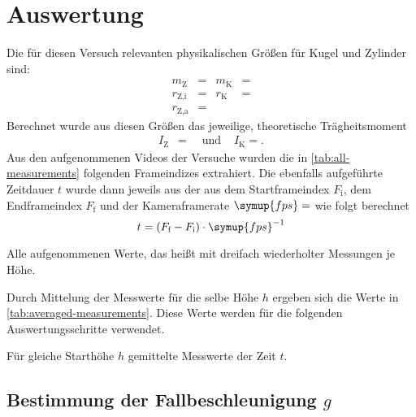 \section{Auswertung}
\label{sec:Auswertung}
Die für diesen Versuch relevanten physikalischen Größen für Kugel und Zylinder sind:
\begin{align}
  \label{eq:physical-properties}
  m_\text{Z} &=  & m_\text{K} &= \nonumber\\
  r_{\text{Z},\text{i}} &=  & r_\text{K} &= \\
  r_{\text{Z},\text{a}} &=  &&\nonumber
\end{align}
Berechnet wurde aus diesen Größen das jeweilige, theoretische Trägheitsmoment
\begin{align}
  \label{eq:moments-inertia}
  I_\text{Z} &= \quad\text{ und } & I_\text{K} = .
\end{align}
Aus den aufgenommenen Videos der Versuche wurden die in \autoref{tab:all-measurements} folgenden Frameindizes extrahiert.
Die ebenfalls aufgeführte Zeitdauer $t$ wurde dann jeweils aus der aus dem Startframeindex $F_\text{i}$,
dem Endframeindex $F_\text{f}$ und der Kameraframerate $\symup{fps}=$ wie folgt 
berechnet
\begin{equation*}
  t = (F_\text{f} - F_\text{i})\cdot\symup{fps}^{-1}
\end{equation*}

\begin{table}
  \centering
  \caption{Alle aufgenommenen Werte, das heißt mit dreifach wiederholter Messungen je Höhe.}
  \label{tab:all-measurements}
  
\end{table}

Durch Mittelung der Messwerte für die selbe Höhe $h$ ergeben sich die Werte
in \autoref{tab:averaged-measurements}. Diese Werte werden für die folgenden
Auswertungsschritte verwendet.

\begin{table}
  \centering
  \caption{Für gleiche Starthöhe $h$ gemittelte Messwerte der Zeit $t$.}
  \label{tab:averaged-measurements}
  
\end{table}

\subsection{Bestimmung der Fallbeschleunigung $g$}

